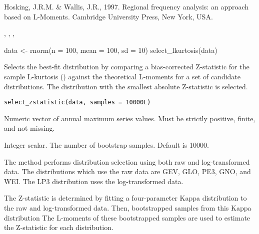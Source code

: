 \documentclass[a4paper]{book}
\begin{document}
%
\begin{References}
Hosking, J.R.M. \& Wallis, J.R., 1997. Regional frequency analysis: an approach based
on L-Moments. Cambridge University Press, New York, USA.
\end{References}
%
\begin{SeeAlso}
, , ,
\end{SeeAlso}
%
\begin{Examples}
\begin{ExampleCode}
data <- rnorm(n = 100, mean = 100, sd = 10)
select_lkurtosis(data)

\end{ExampleCode}
\end{Examples}
%
\begin{Description}
Selects the best-fit distribution by comparing a bias-corrected Z-statistic for
the sample L-kurtosis () against the theoretical L-moments for a set
of candidate distributions. The distribution with the smallest absolute Z-statistic
is selected.
\end{Description}
%
\begin{Usage}
\begin{verbatim}
select_zstatistic(data, samples = 10000L)
\end{verbatim}
\end{Usage}
%
\begin{Arguments}
\begin{ldescription}
\item[\code{data}] Numeric vector of annual maximum series values.
Must be strictly positive, finite, and not missing.

\item[\code{samples}] Integer scalar. The number of bootstrap samples. Default is 10000.
\end{ldescription}
\end{Arguments}
%
\begin{Details}
The method performs distribution selection using both raw and log-transformed data. The
distributions which use the raw data are GEV, GLO, PE3, GNO, and WEI. The LP3 distribution
uses the log-transformed data.

The Z-statistic is determined by fitting a four-parameter Kappa distribution to the
raw and log-transformed data. Then, bootstrapped samples from this Kappa distribution
The L-moments of these bootstrapped samples are used to estimate the Z-statistic
for each distribution.
\end{Details}
\end{document}
